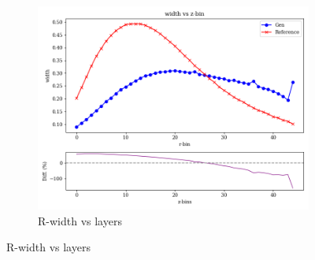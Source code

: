 \begin{figure}[htbp]
\begin{subfigure}[b]{0.3\textwidth}
        \centering
        \includegraphics[width=\textwidth]{Figures/robust4.png}
        \caption{R-width vs layers}
        \label{fig:robust4}
    \end{subfigure}
    

    \vspace{0.35cm} %

    

\end{figure}
